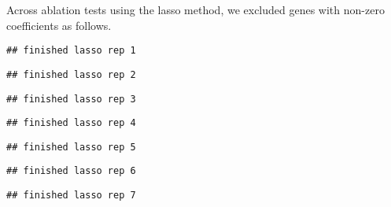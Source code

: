\documentclass[]{article}
\newenvironment{Shaded}{\begin{snugshade}}{\end{snugshade}}
\newcommand{\ControlFlowTok}[1]{\textcolor[rgb]{0.13,0.29,0.53}{\textbf{#1}}}
\newcommand{\DataTypeTok}[1]{\textcolor[rgb]{0.13,0.29,0.53}{#1}}
\newcommand{\DecValTok}[1]{\textcolor[rgb]{0.00,0.00,0.81}{#1}}
\newcommand{\KeywordTok}[1]{\textcolor[rgb]{0.13,0.29,0.53}{\textbf{#1}}}
\newcommand{\NormalTok}[1]{#1}
\newcommand{\OperatorTok}[1]{\textcolor[rgb]{0.81,0.36,0.00}{\textbf{#1}}}
\newcommand{\StringTok}[1]{\textcolor[rgb]{0.31,0.60,0.02}{#1}}
\begin{document}
Across ablation tests using the lasso method, we excluded genes with
non-zero coefficients as follows.

\begin{Shaded}
\end{Shaded}

\begin{verbatim}
## finished lasso rep 1
\end{verbatim}

\begin{verbatim}
## finished lasso rep 2
\end{verbatim}

\begin{verbatim}
## finished lasso rep 3
\end{verbatim}

\begin{verbatim}
## finished lasso rep 4
\end{verbatim}

\begin{verbatim}
## finished lasso rep 5
\end{verbatim}

\begin{verbatim}
## finished lasso rep 6
\end{verbatim}

\begin{verbatim}
## finished lasso rep 7
\end{verbatim}
\end{document}

